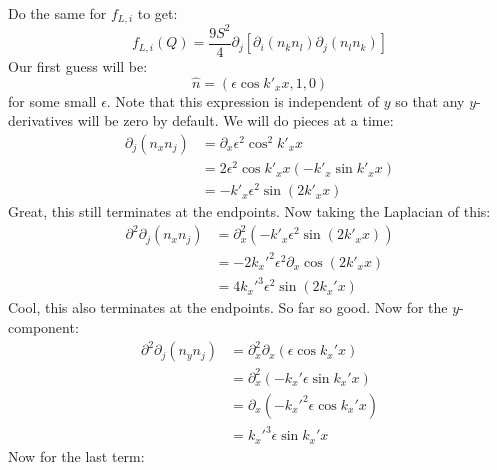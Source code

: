 \documentclass[reqno]{article}
\begin{document}
	Do the same for $f_{L, i}$ to get:
	\begin{equation}
		f_{L, i} (Q) = \frac{9 S^2}{4} \partial_j 
		\left[
		\partial_i \left( n_k n_l \right)
		\partial_j \left( n_l n_k \right)
		\right]
	\end{equation}
	Our first guess will be:
	\begin{equation}
		\hat{n} = \left( \epsilon \cos k'_x x, 1, 0 \right)
	\end{equation}
	for some small $\epsilon$. 
	Note that this expression is independent of $y$ so that any $y$-derivatives will be zero by default.
	We will do pieces at a time:
	\begin{equation}
	\begin{split}
		\partial_j \left( n_x n_j \right)
		&= \partial_x \epsilon^2 \cos^2 k'_x x \\
		&= 2 \epsilon^2 \cos k'_x x \left( -k'_x \sin k'_x x \right) \\
		&= -k'_x \epsilon^2 \sin \left( 2 k'_x x \right)
	\end{split}
	\end{equation}
	Great, this still terminates at the endpoints.
	Now taking the Laplacian of this:
	\begin{equation}
	\begin{split}
		\partial^2 \partial_j \left( n_x n_j \right)
		&= \partial_x^2 \left( -k'_x \epsilon^2 \sin \left( 2 k'_x x \right) \right) \\
		&= - 2 k_x'^2 \epsilon^2 \partial_x \cos \left( 2 k'_x x \right) \\
		&= 4 k_x'^3 \epsilon^2 \sin \left( 2 k_x' x \right)
	\end{split}
	\end{equation}
	Cool, this also terminates at the endpoints. 
	So far so good.
	Now for the $y$-component:
	\begin{equation}
	\begin{split}
		\partial^2 \partial_j \left( n_y n_j \right)
		&= \partial_x^2 \partial_x \left( \epsilon \cos k_x' x \right) \\
		&= \partial_x^2 \left( - k_x' \epsilon \sin k_x' x \right) \\
		&= \partial_x \left( - k_x'^2 \epsilon \cos k_x' x \right) \\
		&= k_x'^3 \epsilon \sin k_x' x
	\end{split}
	\end{equation}
	Now for the last term:
\end{document}
